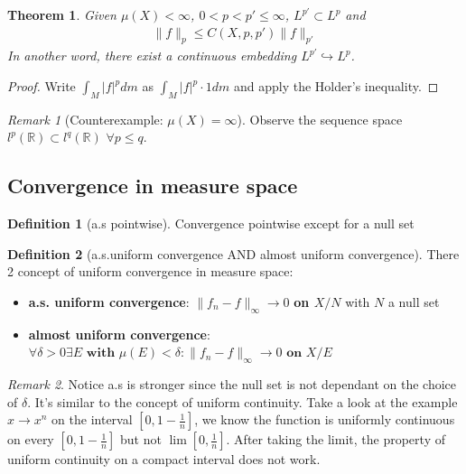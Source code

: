 \documentclass[a4paper,11pt,oneside,fleqn]{book}
\newtheorem{theorem}{Theorem}[section]
\theoremstyle{definition}
\newtheorem{definition}{Definition}[section]
\theoremstyle{remark}
\newtheorem*{remark}{Remark}
\begin{document}
\begin{theorem}
	Given $\mu(X) < \infty$, $0 < p < p' \leq \infty$, $L^{p'} \subset L^p$ and 
	\begin{align*}
		\|f\|_p \leq C(X, p, p') \|f\|_{p'}
	\end{align*}
	In another word, there exist a continuous embedding $L^{p'} \hookrightarrow L^p$.
\end{theorem}
\begin{proof}
	Write $\int_{M}|f|^p dm $ as $\int_M |f|^p \cdot 1 dm $ and apply the Holder's inequality. 
\end{proof}
\begin{remark}[Counterexample: $\mu(X) = \infty$]
Observe the sequence space $l^p(\mathbb{R}) \subset l^q(\mathbb{R})$ $\forall p \le q$. 
\end{remark}


\subsection{Convergence in measure space }
\begin{definition}[a.s pointwise]
Convergence pointwise except for a null set 
\end{definition}

\begin{definition}[a.s.uniform convergence AND almost uniform convergence]
There 2 concept of uniform convergence in measure space:
\begin{itemize}
	\item \textbf{a.s. uniform convergence}: 
		$\|f_n - f\|_\infty \rightarrow 0$  \textbf{on $X\slash N$} with $N$ a null set
	\item \textbf{almost uniform convergence}: $\forall \delta > 0 \exists E \textbf{ with } \mu(E) < \delta: \|f_n - f\|_\infty \rightarrow 0 \textbf{ on } X \slash E$
\end{itemize}
\end{definition}
\begin{remark}
Notice a.s is stronger since the null set is not dependant on the choice of $\delta$.	It's similar to the concept of uniform continuity. Take a look at the example $x \rightarrow x^n$ on the interval $[0, 1- \frac{1}{n}]$, we know the function is uniformly continuous on every $[0, 1 - \frac{1}{n}]$ but not $\lim [0, \frac{1}{n}]$. After taking the limit, the property of uniform continuity on a compact interval does not work.
\end{remark}
\end{document}
